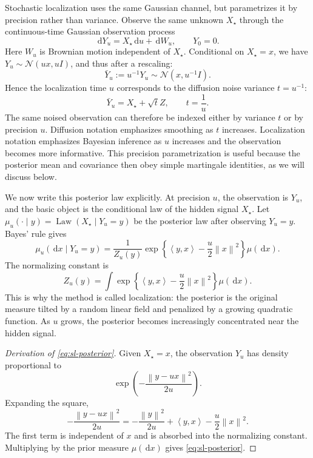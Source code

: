\documentclass[10pt,a4paper]{amsart}
\numberwithin{equation}{section}
\DeclareMathOperator{\Law}{Law}
\newcommand{\dd}{\,\mathrm{d}}
\newcommand{\Id}{I}
\newcommand{\norm}[1]{\left\lVert #1 \right\rVert}
\newcommand{\ip}[2]{\left\langle #1,#2 \right\rangle}
\newcommand{\normal}[2]{\mathcal{N}\!\left(#1,#2\right)}
\begin{document}
Stochastic localization uses the same Gaussian channel, but parametrizes it by
precision rather than variance.  Observe the same unknown $X_\star$ through
the continuous-time Gaussian observation process
\begin{equation}\label{eq:sl-observation}
    \dd Y_u=X_\star\dd u+\dd W_u,\qquad Y_0=0.
\end{equation}
Here $W_u$ is Brownian motion independent of $X_\star$.  Conditional on
$X_\star=x$, we have $Y_u\sim\normal{ux}{u\Id}$, and thus after a rescaling:
\[
    \bar Y_u:=u^{-1}Y_u\sim\normal{x}{u^{-1}\Id}.
\]
Hence the localization time $u$ corresponds to the diffusion noise variance
$t=u^{-1}$:
\[
    \bar Y_u=X_\star+\sqrt{t}Z,
    \qquad t=\frac1u.
\]
The same noised observation can therefore be indexed either by variance
$t$ or by precision $u$.  Diffusion notation emphasizes smoothing as
$t$ increases.  Localization notation emphasizes Bayesian inference as
$u$ increases and the observation becomes more informative.  This precision
parametrization is useful because the posterior mean and covariance then obey
simple martingale identities, as we will discuss below.

We now write this posterior law explicitly.  At precision $u$, the
observation is $Y_u$, and the basic object is the conditional law of the hidden
signal $X_\star$.  Let
$\mu_u(\cdot \mid y)=\Law(X_\star\mid Y_u = y)$ be the posterior law after
observing $Y_u = y$.  Bayes' rule gives
\begin{equation}\label{eq:sl-posterior}
    \mu_{u}(\dd x \mid Y_u = y)
    =
    \frac{1}{Z_u(y)}
    \exp\left\{\ip{y}{x}-\frac{u}{2}\norm{x}^2\right\}\mu(\dd x).
\end{equation}
The normalizing constant is
\[
    Z_u(y)=
    \int
    \exp\left\{\ip{y}{x}-\frac{u}{2}\norm{x}^2\right\}\mu(\dd x).
\]
This is why the method is called localization: the posterior is the original
measure tilted by a random linear field and penalized by a growing quadratic
function.
As $u$ grows, the posterior becomes increasingly concentrated near the hidden
signal.

\begin{proof}[Derivation of \eqref{eq:sl-posterior}]
Given $X_\star=x$, the observation $Y_u$ has density proportional to
\[
    \exp\left(-\frac{\norm{y-ux}^2}{2u}\right).
\]
Expanding the square,
\[
    -\frac{\norm{y-ux}^2}{2u}
    =
    -\frac{\norm{y}^2}{2u}
    +\ip{y}{x}
    -\frac{u}{2}\norm{x}^2.
\]
The first term is independent of $x$ and is absorbed into the normalizing
constant.  Multiplying by the prior measure $\mu(\dd x)$ gives
\eqref{eq:sl-posterior}.
\end{proof}
\end{document}
